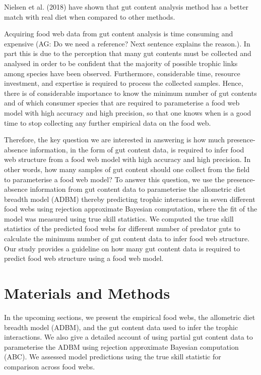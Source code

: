 \documentclass{article}
\begin{document}
Nielsen et al. (2018) have shown that gut content analysis method has a
better match with real diet when compared to other methods.

Acquiring food web data from gut content analysis is time consuming and
expensive (AG: Do we need a reference? Next sentence explains the
reason.). In part this is due to the perception that many gut contents
must be collected and analysed in order to be confident that the
majority of possible trophic links among species have been observed.
Furthermore, considerable time, resource investment, and expertise is
required to process the collected samples. Hence, there is of
considerable importance to know the minimum number of gut contents and
of which consumer species that are required to parameterise a food web
model with high accuracy and high precision, so that one knows when is a
good time to stop collecting any further empirical data on the food web.

Therefore, the key question we are interested in answering is how much
presence-absence information, in the form of gut content data, is
required to infer food web structure from a food web model with high
accuracy and high precision. In other words, how many samples of gut
content should one collect from the field to parameterise a food web
model? To answer this question, we use the presence-absence information
from gut content data to parameterise the allometric diet breadth model
(ADBM) thereby predicting trophic interactions in seven different food
webs using rejection approximate Bayesian computation, where the fit of
the model was measured using true skill statistics. We computed the true
skill statistics of the predicted food webs for different number of
predator guts to calculate the minimum number of gut content data to
infer food web structure. Our study provides a guideline on how many gut
content data is required to predict food web structure using a food web
model.

\hypertarget{materials-and-methods}{%
\section{Materials and Methods}\label{materials-and-methods}}

In the upcoming sections, we present the empirical food webs, the
allometric diet breadth model (ADBM), and the gut content data used to
infer the trophic interactions. We also give a detailed account of using
partial gut content data to parameterise the ADBM using rejection
approximate Bayesian computation (ABC). We assessed model predictions
using the true skill statistic for comparison across food webs.
\end{document}
